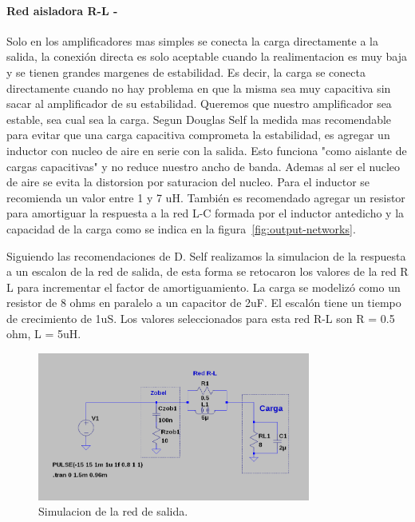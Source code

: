 \documentclass[a4paper,12pt,twoside]{article}
\begin{document}
\paragraph{Red aisladora R-L  -  }

Solo en los amplificadores mas simples se conecta la carga directamente a la salida, la conexión directa es solo aceptable 
cuando la realimentacion es muy baja y se tienen grandes margenes de estabilidad.
Es decir, la carga se conecta directamente cuando no hay problema en que la misma sea muy capacitiva sin sacar al
amplificador de su estabilidad.
Queremos que nuestro amplificador sea estable, sea cual sea la carga.
Segun Douglas Self la medida mas recomendable para evitar que una carga capacitiva comprometa la estabilidad, es agregar un inductor con nucleo
de aire en serie con la salida. Esto funciona "como aislante de cargas capacitivas" y no reduce nuestro ancho de banda. Ademas al ser el nucleo de
aire se evita la distorsion por saturacion del nucleo.
Para el inductor se recomienda un valor entre 1 y 7 uH.
También es recomendado agregar un resistor para amortiguar la respuesta a la red L-C formada por el inductor antedicho y la capacidad de la carga como se indica en la figura~\ref{fig:output-networks}.

Siguiendo las recomendaciones de D. Self realizamos la simulacion de la respuesta a un escalon de la red de salida, de esta forma se retocaron los 
valores de la red R L para incrementar el factor de amortiguamiento. 
La carga se modelizó como un resistor de 8 ohms en paralelo a un capacitor de 2uF. El escalón tiene un tiempo de crecimiento de 1uS.
Los valores seleccionados para esta red  R-L son R = 0.5 ohm, L = 5uH.

\begin{figure}[H]
\centering
\includegraphics[width=0.8\textwidth]{img/simulacion_zobel}
\caption{Simulacion de la red de salida.}
\label{fig:sim_red_salidas} 
\end{figure}
\end{document}
